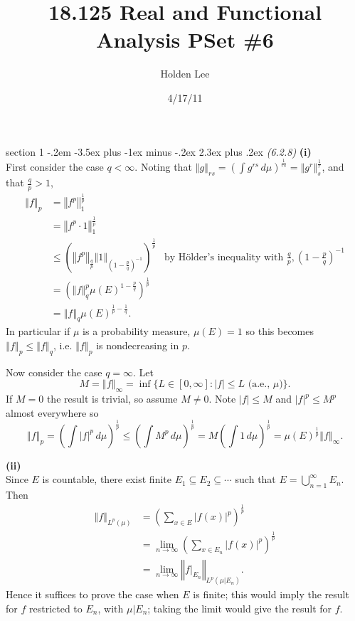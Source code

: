 \documentclass[12pt]{article}
\makeatletter
\theoremstyle{norm}
\newcommand{\rc}[1]{\frac{1}{#1}}
\newcommand{\subeq}[0]{\subseteq}
\newcommand{\pa}[1]{\left( {#1} \right)}
\newcommand{\ve}[1]{\left\Vert {#1}\right\Vert}
\newcommand{\subprob}[1]{\noindent\textbf{#1}\\}
\newcommand{\pf}[2]{\pa{\frac{#1}{#2}}}
\newcommand{\iy}[0]{\infty}
\newenvironment{problem}{\@startsection
       {section}
       {1}
       {-.2em}
       {-3.5ex plus -1ex minus -.2ex}
       {2.3ex plus .2ex}
       {\pagebreak[3]%
       \large\bf\noindent{Problem }
       }
       }
       {%
       }
\makeatother
\begin{document}
\title{18.125 Real and Functional Analysis PSet \#6}%
\author{Holden Lee}
\date{4/17/11}%
\maketitle
\thispagestyle{empty}
\begin{problem}{\it (6.2.8)}
\subprob{(i)}
First consider the case $q<\iy$. 
Noting that $\ve{g}_{rs}=\pa{\int g^{rs}\,d\mu}^{\rc{rs}}=\ve{g^r}_s^{\rc r}$, and that $\frac qp>1$,
\begin{align*}
\ve{f}_{p}&=\ve{f^p}_1^{\rc p}\\
&=\ve{f^p\cdot 1}_1^{\rc p}\\
&\le\pa{\ve{f^p}_{\frac qp}\ve{1}_{\pa{1-\frac pq}^{-1}}}^{\rc p}&\text{by H\"older's inequality with }\frac qp,\pa{1-\frac pq}^{-1}\\
&=\pa{\ve{f}_{q}^p\mu(E)^{1-\frac pq}}^{\rc p}\\
&=\ve{f}_q\mu(E)^{\rc p-\rc q}.
\end{align*}
In particular if $\mu$ is a probability measure, $\mu(E)=1$ so this becomes $\ve{f}_p\le \ve{f}_q$, i.e. $\ve{f}_p$ is nondecreasing in $p$.

Now consider the case $q=\iy$. Let
\begin{equation}\label{p6-1-1}
M=\ve{f}_{\iy} =\inf\{L\in [0,\iy]: |f|\le L\text{ (a.e., }\mu)\}.
\end{equation}
If $M=0$ the result is trivial, so assume $M\ne 0$. 
Note $|f|\le M$ and $|f|^p\le M^p$ almost everywhere so
\begin{equation}\label{p6-1-2}
\ve{f}_p=\pa{\int|f|^p\,d\mu}^{\rc p}\le\pa{ \int M^p\,d\mu}^{\rc p}=M\pa{ \int 1\,d\mu}^{\rc p}=\mu(E)^{\rc p}\ve{f}_{\iy}.%
\end{equation}

\subprob{(ii)}
Since $E$ is countable, there exist finite $E_1\subeq E_2\subeq \cdots$ such that $E=\bigcup_{n=1}^{\iy} E_n$. Then
\begin{align*}
\ve{f}_{L^p(\mu)}&=\pa{\sum_{x\in E} |f(x)|^p}^{\rc p}\\
&=\lim_{n\to \iy} \pa{\sum_{x\in E_n} |f(x)|^p}^{\rc p}\\
&=\lim_{n\to \iy} \ve{f|_{E_n}}_{L^p(\mu|E_n)}.
\end{align*}
Hence it suffices to prove the case when $E$ is finite; this would imply the result for $f$ restricted to $E_n$, with $\mu|E_n$; taking the limit would give the result for $f$.


\end{problem}
\end{document}
